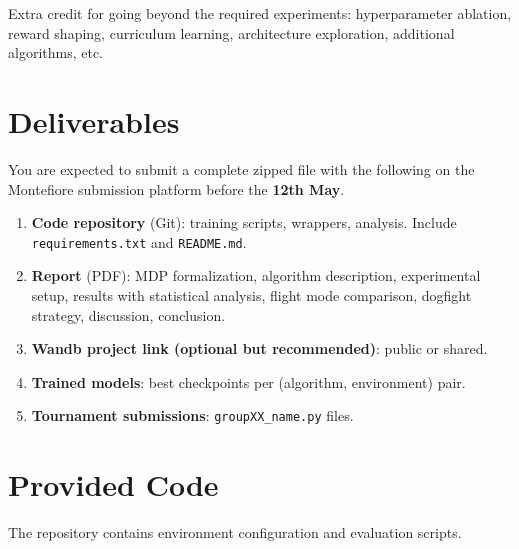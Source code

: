 \documentclass[11pt,a4paper]{article}
\begin{document}
Extra credit for going beyond the required experiments: hyperparameter ablation, reward shaping, curriculum learning, architecture exploration, additional algorithms, etc.

\section{Deliverables}
\label{sec:deliverables}

You are expected to submit a complete zipped file with the following on the Montefiore submission platform before the \textbf{12th May}.
\begin{enumerate}[nosep]
  \item \textbf{Code repository} (Git): training scripts, wrappers, analysis. Include \texttt{requirements.txt} and \texttt{README.md}.
  \item \textbf{Report} (PDF): MDP formalization, algorithm description, experimental setup, results with statistical analysis, flight mode comparison, dogfight strategy, discussion, conclusion.
  \item \textbf{Wandb project link (optional but recommended)}: public or shared.
  \item \textbf{Trained models}: best checkpoints per (algorithm, environment) pair.
  \item \textbf{Tournament submissions}: \texttt{groupXX\_name.py} files.
\end{enumerate}

\section{Provided Code}
\label{sec:starter}

The repository contains environment configuration and evaluation scripts.
\end{document}
